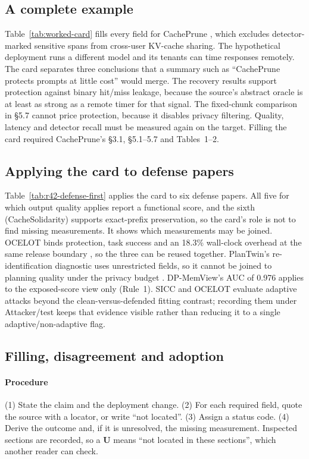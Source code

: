 \subsection{A complete example}
Table~\ref{tab:worked-card} fills every field for CachePrune \cite{wu2026cacheprune}, which excludes detector-marked sensitive spans from cross-user KV-cache sharing. The hypothetical deployment runs a different model and its tenants can time responses remotely. The card separates three conclusions that a summary such as ``CachePrune protects prompts at little cost'' would merge. The recovery results support protection against binary hit/miss leakage, because the source's abstract oracle is at least as strong as a remote timer for that signal. The fixed-chunk comparison in \S5.7 cannot price protection, because it disables privacy filtering. Quality, latency and detector recall must be measured again on the target. Filling the card required CachePrune's \S3.1, \S5.1--5.7 and Tables~1--2.



\subsection{Applying the card to defense papers}
Table~\ref{tab:r42-defense-first} applies the card to six defense papers. All five for which output quality applies report a functional score, and the sixth (CacheSolidarity) supports exact-prefix preservation, so the card's role is not to find missing measurements. It shows which measurements may be joined. OCELOT binds protection, task success and an 18.3\% wall-clock overhead at the same release boundary \cite{xie2026ocelot}, so the three can be reused together. PlanTwin's re-identification diagnostic uses unrestricted fields, so it cannot be joined to planning quality under the privacy budget \cite{yu2026plantwin}. DP-MemView's AUC of 0.976 applies to the exposed-score view only (Rule~1). SICC and OCELOT evaluate adaptive attacks beyond the clean-versus-defended fitting contrast; recording them under Attacker/test keeps that evidence visible rather than reducing it to a single adaptive/non-adaptive flag.



\subsection{Filling, disagreement and adoption}
\paragraph{Procedure}
(1) State the claim and the deployment change. (2) For each required field, quote the source with a locator, or write ``not located''. (3) Assign a status code. (4) Derive the outcome and, if it is unresolved, the missing measurement. Inspected sections are recorded, so a \textbf{U} means ``not located in these sections'', which another reader can check.

